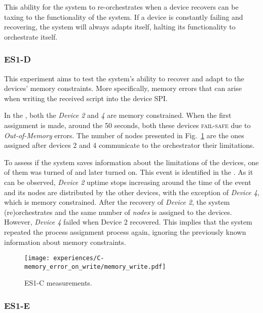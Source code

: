 This ability for the system to re-orchestrates when a device recovers can be taxing to the functionality of the system. If a device is constantly failing and recovering, the system will always adapts itself, halting its functionality to orchestrate itself.


\subsubsection{ES1-D}

This experiment aims to test the system's ability to recover and adapt to the devices' memory constraints. More specifically, memory errors that can arise when writing the received script into the device SPI.

In the , both the \textit{Device 2} and \textit{4} are memory constrained. When the first assignment is made, around the 50 seconds, both these devices \textsc{fail-safe} due to \textit{Out-of-Memory} errors. The number of nodes presented in Fig.~\ref{fig:experiment_c_graph} are the ones assigned after devices 2 and 4 communicate to the orchestrator their limitations. 

To assess if the system saves information about the limitations of the devices, one of them was turned of and later turned on. This event is identified in the . As it can be observed, \textit{Device 2} uptime stops increasing around the time of the event and its nodes are distributed by the other devices, with the exception of \textit{Device 4}, which is memory constrained. 
After the recovery of \textit{Device 2}, the system (re)orchestrates and the same number of \textit{nodes} is assigned to the devices. However, \textit{Device 4} failed when Device 2 recovered. This implies that the system repeated the process assignment process again, ignoring the previously known information about memory constraints.

\begin{figure}[h]
\centering
\texttt{[image: experiences/C-memory\_error\_on\_write/memory\_write.pdf]}
\caption[ES1-C measurements]{ES1-C measurements.}\label{fig:experiment_c_graph}
\end{figure}



\subsubsection{ES1-E}

